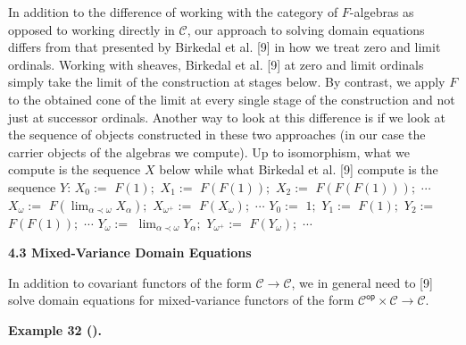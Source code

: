 In addition to the difference of working with the category of $F$-algebras as opposed to working directly in $\mathcal{C}$, our approach to solving domain equations differs from that presented by Birkedal et al. [9] in how we treat zero and limit ordinals. Working with sheaves, Birkedal et al. [9] at zero and limit ordinals simply take the limit of the construction at stages below. By contrast, we apply $F$ to the obtained cone of the limit at every single stage of the construction and not just at successor ordinals. Another way to look at this difference is if we look at the sequence of objects constructed in these two approaches (in our case the carrier objects of the algebras we compute). Up to isomorphism, what we compute is the sequence $X$ below while what Birkedal et al. [9] compute is the sequence $Y$:      $\displaystyle X_{0}:={}$ $\displaystyle F(1);$ $\displaystyle X_{1}:={}$ $\displaystyle F(F(1));$ $\displaystyle X_{2}:={}$ $\displaystyle F(F(F(1)));$ $\displaystyle\cdots$ $\displaystyle X_{\omega}:={}$ $\displaystyle F(\lim_{\alpha\prec\omega}X_{\alpha});$ $\displaystyle X_{{\omega}^{+}}:={}$ $\displaystyle F(X_{\omega});$ $\displaystyle\cdots$    $\displaystyle Y_{0}:={}$ $\displaystyle 1;$ $\displaystyle Y_{1}:={}$ $\displaystyle F(1);$ $\displaystyle Y_{2}:={}$ $\displaystyle F(F(1));$ $\displaystyle\cdots$ $\displaystyle Y_{\omega}:={}$ $\displaystyle\lim_{\alpha\prec\omega}Y_{\alpha};$ $\displaystyle Y_{{\omega}^{+}}:={}$ $\displaystyle F(Y_{\omega});$ $\displaystyle\cdots$\par
 
 
 
 
 
 
\par\medskip\noindent\textbf{4.3 Mixed-Variance Domain Equations}\par
 
 
In addition to covariant functors of the form $\mathcal{C}\to\mathcal{C}$, we in general need to [9] solve domain equations for mixed-variance functors of the form ${\mathcal{C}}^{\mathsf{op}}\times\mathcal{C}\to\mathcal{C}$.\par
 
 
 
\par\medskip\noindent\textbf{Example 32 ().}\par
 
